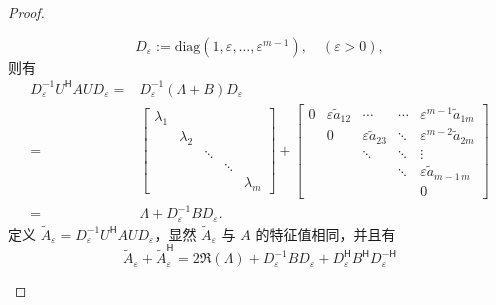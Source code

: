 \begin{proof}
\begin{enumerate}
\[                  D_\varepsilon := \text{diag}(1,\varepsilon,\dots,\varepsilon^{m-1}),\quad (\varepsilon > 0),
              \]
              则有
              \begin{align*}
                  D_\varepsilon^{-1} U^\mathsf{H} A U D_\varepsilon
                  ={} & D_\varepsilon^{-1} ( \Lambda + B ) D_\varepsilon    \\
                  ={} & \begin{bmatrix}
                            \lambda_1 &           &        &        &           \\
                                      & \lambda_2 &        &        &           \\
                                      &           & \ddots &        &           \\
                                      &           &        & \ddots &           \\
                                      &           &        &        & \lambda_m
                        \end{bmatrix}
                  +
                  \begin{bmatrix}
                      0 & \varepsilon \tilde{a}_{12} & \cdots                    & \cdots & \varepsilon^{m-1} \tilde{a}_{1m} \\
                        & 0                          & \varepsilon\tilde{a}_{23} & \ddots & \varepsilon^{m-2} \tilde{a}_{2m} \\
                        &                            & \ddots                    & \ddots & \vdots                           \\
                        &                            &                           & \ddots & \varepsilon \tilde{a}_{m-1\,m}   \\
                        &                            &                           &        & 0
                  \end{bmatrix}
                  \\
                  ={} & \Lambda + D_\varepsilon^{-1} B D_\varepsilon.
              \end{align*}
              定义 $\widetilde{A}_\varepsilon = D_\varepsilon^{-1} U^\mathsf{H} A U D_\varepsilon$，显然 $\widetilde{A}_\varepsilon$ 与 $A$ 的特征值相同，并且有
              \[
                  \widetilde{A}_\varepsilon + \widetilde{A}^{\mathsf{H}}_\varepsilon
                  ={}  2 \Re(\Lambda) + D_\varepsilon^{-1} B D_\varepsilon + D_\varepsilon^{\mathsf{H}} B^{\mathsf{H}} D_\varepsilon^{-\mathsf{H}}
\]
\end{enumerate}
\end{proof}
